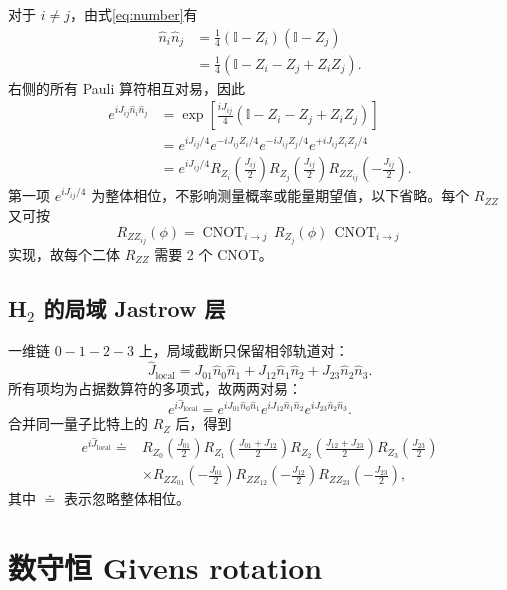 \documentclass[11pt,a4paper]{ctexart}
\newcommand{\Id}{\mathbb{I}}
\newcommand{\CNOT}{\operatorname{CNOT}}
\newcommand{\RZ}{R_{Z}}
\newcommand{\RZZ}{R_{ZZ}}
\begin{document}
对于 $i\neq j$，由式\eqref{eq:number}有
\begin{align}
\hat n_i\hat n_j
&=\frac14(\Id-Z_i)(\Id-Z_j) \\
&=\frac14(\Id-Z_i-Z_j+Z_iZ_j).
\end{align}
右侧的所有 Pauli 算符相互对易，因此
\begin{align}
e^{iJ_{ij}\hat n_i\hat n_j}
&=\exp\!\left[\frac{iJ_{ij}}4(\Id-Z_i-Z_j+Z_iZ_j)\right]\\
&=e^{iJ_{ij}/4}e^{-iJ_{ij}Z_i/4}e^{-iJ_{ij}Z_j/4}e^{+iJ_{ij}Z_iZ_j/4}\\
&=e^{iJ_{ij}/4}\RZ_i\!\left(\frac{J_{ij}}2\right)
  \RZ_j\!\left(\frac{J_{ij}}2\right)
  \RZZ_{ij}\!\left(-\frac{J_{ij}}2\right).
\label{eq:jastrow-map}
\end{align}
第一项 $e^{iJ_{ij}/4}$ 为整体相位，不影响测量概率或能量期望值，以下省略。每个 $R_{ZZ}$ 又可按
\begin{equation}
    \RZZ_{ij}(\phi)=\CNOT_{i\to j}\,\RZ_j(\phi)\,\CNOT_{i\to j}
    \label{eq:rzz}
\end{equation}
实现，故每个二体 $R_{ZZ}$ 需要 2 个 CNOT。

\subsection{H$_2$ 的局域 Jastrow 层}

一维链 $0-1-2-3$ 上，局域截断只保留相邻轨道对：
\begin{equation}
    \hat J_{\mathrm{local}}
    =J_{01}\hat n_0\hat n_1+J_{12}\hat n_1\hat n_2+J_{23}\hat n_2\hat n_3.
\end{equation}
所有项均为占据数算符的多项式，故两两对易：
\begin{equation}
    e^{i\hat J_{\mathrm{local}}}
    =e^{iJ_{01}\hat n_0\hat n_1}
     e^{iJ_{12}\hat n_1\hat n_2}
     e^{iJ_{23}\hat n_2\hat n_3}.
\end{equation}
合并同一量子比特上的 $R_Z$ 后，得到
\begin{align}
e^{i\hat J_{\mathrm{local}}}\doteq{}&
\RZ_0\!\left(\frac{J_{01}}2\right)
\RZ_1\!\left(\frac{J_{01}+J_{12}}2\right)
\RZ_2\!\left(\frac{J_{12}+J_{23}}2\right)
\RZ_3\!\left(\frac{J_{23}}2\right)\\
&\times\RZZ_{01}\!\left(-\frac{J_{01}}2\right)
\RZZ_{12}\!\left(-\frac{J_{12}}2\right)
\RZZ_{23}\!\left(-\frac{J_{23}}2\right),
\label{eq:merged-j}
\end{align}
其中 $\doteq$ 表示忽略整体相位。

\section{数守恒 Givens rotation}
\end{document}

